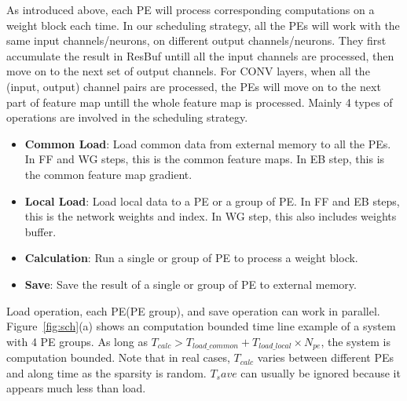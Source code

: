 As introduced above, each PE will process corresponding computations on a weight block each time. In our scheduling strategy, all the PEs will work with the same input channels/neurons, on different output channels/neurons. They first accumulate the result in ResBuf untill all the input channels are processed, then move on to the next set of output channels. For CONV layers, when all the (input, output) channel pairs are processed, the PEs will move on to the next part of feature map untill the whole feature map is processed. Mainly 4 types of operations are involved in the scheduling strategy.
\begin{itemize}
	\item {{\bf{Common Load}}: Load common data from external memory to all the PEs. In FF and WG steps, this is the common feature maps. In EB step, this is the common feature map gradient.}
    \item {{\bf{Local Load}}: Load local data to a PE or a group of PE. In FF and EB steps, this is the network weights and index. In WG step, this also includes weights buffer.}
    \item {{\bf{Calculation}}: Run a single or group of PE to process a weight block.}
    \item {{\bf{Save}}: Save the result of a single or group of PE to external memory.}
\end{itemize}
 Load operation, each PE(PE group), and save operation can work in parallel. Figure~\ref{fig:sch}(a) shows an computation bounded time line example of a system with 4 PE groups. As long as $T_{calc}>T_{load\_common} + T_{load\_local}\times N_{pe}$, the system is computation bounded. Note that in real cases, $T_{calc}$ varies between different PEs and along time as the sparsity is random. $T_save$ can usually be ignored because it appears much less than load.   


